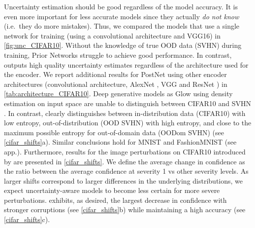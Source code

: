 Uncertainty estimation should be good regardless of the model accuracy. It is even more important for less accurate models since they actually \emph{do not know} (i.e.\ they do more mistakes). Thus, we compared the models that use a single network for training (using a convolutional architecture and VGG16) in \cref{fig:unc_CIFAR10}. Without the knowledge of true OOD data (SVHN) during training, Prior Networks struggle to achieve good performance. In contrast, \PostNetacro outputs high quality uncertainty estimates regardless of the architecture used for the encoder. We report additional results for PostNet using other encoder architectures (convolutional architecture, AlexNet \cite{alexnet}, VGG \cite{vgg} and ResNet \cite{resnet}) in \cref{tab:architecture_CIFAR10}. Deep generative models as Glow \cite{glow} using density estimation on input space are unable to distinguish between CIFAR10 and SVHN \cite{deep-generative}. In contrast, \PostNetacro clearly distinguishes between in-distribution data (CIFAR10) with low entropy, out-of-distribution (OOD SVHN) with high entropy, and close to the maximum possible entropy for out-of-domain data (OODom SVHN) (see \cref{cifar_shifts}a). Similar conclusions hold for MNIST and FashionMNIST (see app.). Furthermore, results for the image perturbations on CIFAR10 introduced by \cite{benchmarking-corruptions} are presented in \cref{cifar_shifts}.  We define the average change in confidence as the ratio between the average confidence  at severity 1 vs other severity levels. As larger shifts correspond to larger differences in the underlying distributions, we expect uncertainty-aware models to become less certain for more severe perturbations. \PostNet exhibits, as desired, the largest decrease in confidence with stronger corruptions (see \cref{cifar_shifts}b) while maintaining a high accuracy (see \cref{cifar_shifts}c).

